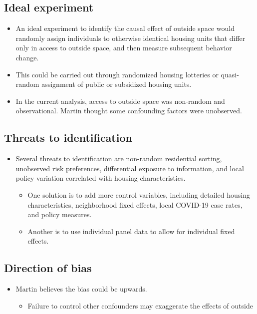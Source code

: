 \documentclass[
  letterpaper,
  DIV=11,
  numbers=noendperiod]{scrartcl}
\providecommand{\tightlist}{%
  \setlength{\itemsep}{0pt}\setlength{\parskip}{0pt}}
\begin{document}
\subsection{Ideal experiment}\label{ideal-experiment}

\begin{itemize}
\item
  An ideal experiment to identify the causal effect of outside space
  would randomly assign individuals to otherwise identical housing units
  that differ only in access to outside space, and then measure
  subsequent behavior change.
\item
  This could be carried out through randomized housing lotteries or
  quasi-random assignment of public or subsidized housing units.
\item
  In the current analysis, access to outside space was non-random and
  observational. Martin thought some confounding factors were
  unobserved.
\end{itemize}

\subsection{Threats to identification}\label{threats-to-identification}

\begin{itemize}
\item
  Several threats to identification are non-random residential sorting,
  unobserved risk preferences, differential exposure to information, and
  local policy variation correlated with housing characteristics.

  \begin{itemize}
  \item
    One solution is to add more control variables, including detailed
    housing characteristics, neighborhood fixed effects, local COVID-19
    case rates, and policy measures.
  \item
    Another is to use individual panel data to allow for individual
    fixed effects.
  \end{itemize}
\end{itemize}

\subsection{Direction of bias}\label{direction-of-bias}

\begin{itemize}
\item
  Martin believes the bias could be upwards.

  \begin{itemize}
  \tightlist
  \item
    Failure to control other confounders may exaggerate the effects of
    outside
  \end{itemize}
\end{itemize}
\end{document}
